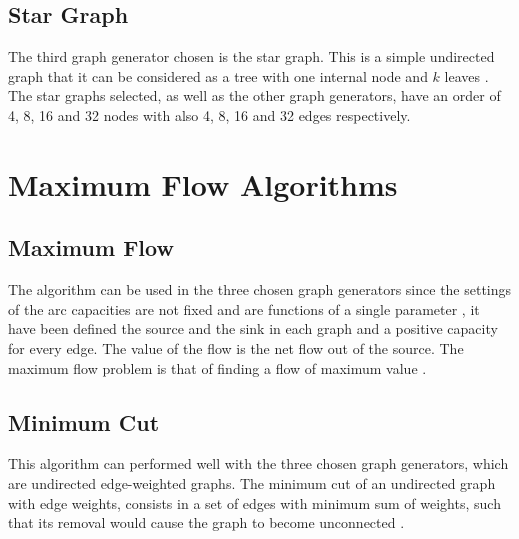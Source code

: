 \documentclass[10pt,a4paper,openany]{article}
\begin{document}
	\subsection*{Star Graph}
	The third graph generator chosen is the star graph. This is a simple undirected graph that it can be considered as a tree with one internal node and $ k $ leaves \citep{mendia1992optimal}. The star graphs selected, as well as the other graph generators, have an order of 4, 8, 16 and 32 nodes with also 4, 8, 16 and 32 edges respectively.

\newpage

	
	
	\section*{Maximum Flow Algorithms}
	
	\subsection*{Maximum Flow}
	The algorithm can be used in the three chosen graph generators since the settings of the arc capacities
	are not fixed and are functions of a single parameter \citep{gallo1989fast}, it have been defined the source and the sink in each graph and a positive capacity for every edge. The value of the flow is the net flow out of the source. The maximum flow problem is that of finding a flow of maximum value \citep*{king1994faster}.
	
	
	
	

\newpage
	
	
	
	\subsection*{Minimum Cut}
	This algorithm can performed well with the three chosen graph generators, which are undirected edge-weighted graphs. The minimum cut of an undirected graph with edge weights, consists in a set of edges with minimum sum of weights, such that its removal would cause the graph to become unconnected \citep{stoer1997simple}.
	
	
	
\end{document}
